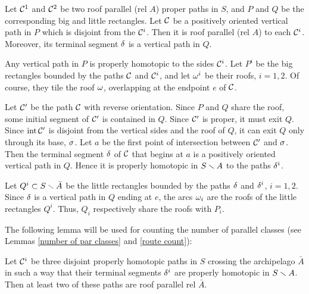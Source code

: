 \begin{lem}\label{intermediate paths}
Let ${\cal C}^1$ and ${\cal C}^2$ be two roof parallel (rel $A$) proper paths in $S$,
and $P$ and $Q$ be the corresponding big and little rectangles.
  Let ${\cal C}$ be a positively oriented vertical path in $P$
which is disjoint from the ${\cal C}^i$.
Then it is roof parallel (rel $A$) to each ${\cal C}^i$. 
Moreover, its terminal segment  ${\delta}$ is a vertical path in $Q$.
\end{lem}

\begin{pf}
 Any vertical  path in $P$ is properly homotopic to the sides ${\cal C}^i$. 
Let $P^i$ be the big rectangles bounded by the paths ${\cal C}$ and ${\cal C}^i$, 
and let ${\omega}^i$ be their roofs, $i=1,2$. 
Of course, they tile the roof ${\omega}$, overlapping at the endpoint $e$ of ${\cal C}$.  


Let ${\cal C}'$ be the path ${\cal C}$ with reverse orientation.
Since $P$ and $Q$ share the roof,  some initial segment of ${\cal C}'$  is contained in $Q$. 
Since ${\cal C}'$ is proper, it must exit $Q$. Since $\operatorname{int} {\cal C}'$ is disjoint from the vertical sides and
the roof of $Q$, it can exit $Q$ only through its base, ${\sigma}$. Let $a$ be the first point of intersection 
between ${\cal C}'$ and ${\sigma}$. Then the terminal segment ${\delta}$ of ${\cal C}$ that begins at $a$ 
is a positively oriented vertical path in $Q$. 
Hence it is properly homotopic in $S\smallsetminus A$ to the paths ${\delta}^i$.


Let $Q^i\subset S\smallsetminus \bar A$ be the little rectangles bounded by the paths ${\delta}$ and ${\delta}^i$, $i=1,2$.
Since ${\delta}$ is a vertical path in $Q$ ending at $e$, the arcs ${\omega}_i$ are the roofs of the little rectangles $Q^i$.
Thus, $Q_i$ respectively share the roofs with $P_i$. 
\end{pf}    


  The following lemma will be used for counting the number of parallel classes
(see Lemmas \ref{number of par classes} and \ref{route count}): 

\begin{lem}\label{3 paths}
  Let ${\cal C}^i$ be three disjoint properly homotopic  paths in $S$ crossing the archipelago $\bar A$
in such a way that their terminal segments ${\delta}^i$ 
are properly homotopic in $S\smallsetminus A$.
Then at least two of these paths are roof parallel rel $\bar A$. 
\end{lem}

